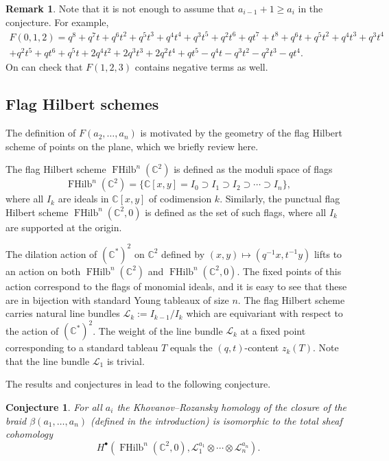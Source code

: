 \documentclass[11pt,reqno]{amsart}
\newtheorem{conjecture}[theorem]{Conjecture}
\theoremstyle{definition}
\newtheorem{remark}[theorem]{Remark}
\numberwithin{equation}{section}
\DeclareMathOperator{\FHilb}{FHilb}
\newcommand{\CC}{\mathbb{C}}
\newcommand{\CL}{\mathcal{L}}
\begin{document}
\begin{remark}
Note that it is not enough to assume that $a_{i-1}+1 \geqslant a_i$ in the conjecture. For example, 
\begin{multline*}
	F(0,1,2)=q^8 + q^7t + q^6t^2 + q^5t^3 + q^4t^4 + q^3t^5 + q^2t^6 + qt^7 + t^8 + q^6t + q^5t^2 + q^4t^3 + q^3t^4 \\
	+ q^2t^5 + qt^6 + q^5t + 2q^4t^2 + 2q^3t^3 + 2q^2t^4 + qt^5 - q^4t - q^3t^2 - q^2t^3 - qt^4.
\end{multline*}
On can check that $F(1,2,3)$ contains negative terms as well.
\end{remark}

\subsection{Flag Hilbert schemes}
\label{subsec.fhilb}

The definition of $F(a_2,\ldots,a_n)$ is motivated by the geometry of the flag Hilbert scheme of points on the plane,
which we briefly review here.

The flag Hilbert scheme $\FHilb^n(\CC^2)$ is defined as the moduli space of flags  
\[
	\FHilb^n(\CC^2)=\{\CC[x,y]=I_0\supset I_1\supset I_2 \supset \cdots \supset I_n\},
\]
where all $I_k$ are ideals in $\CC[x,y]$ of codimension $k$. Similarly, the punctual flag Hilbert scheme $\FHilb^n(\CC^2,0)$
is defined as the set of such flags, where all $I_k$ are supported at the origin.

The dilation action of $(\CC^*)^2$ on $\CC^2$ defined by $(x,y)\mapsto (q^{-1}x,t^{-1}y)$ lifts to an action on both 
$\FHilb^n(\CC^2)$ and $\FHilb^n(\CC^2,0)$. The fixed points of this action correspond to the flags of monomial ideals, 
and it is easy to see that these are in bijection with standard Young tableaux of size $n$. The flag Hilbert scheme carries 
natural line bundles $\CL_k:=I_{k-1}/I_k$ which are equivariant with respect to the action of $(\CC^*)^2$.
The weight of the line bundle $\CL_k$ at a fixed point corresponding to a standard tableau $T$ equals the 
$(q,t)$-content $z_k(T)$. Note that the line bundle $\CL_1$ is trivial.

The results and conjectures in \cite{GNR.2016,OR.2017} lead to the following conjecture.

\begin{conjecture}
For all $a_i$ the Khovanov--Rozansky homology of the closure of the braid $\beta(a_1,\ldots,a_n)$ 
(defined in the introduction) is isomorphic to the total sheaf cohomology
\[
	H^{\bullet}(\FHilb^n(\CC^2,0),\CL_1^{a_1}\otimes\cdots\otimes \CL_n^{a_n}).
\]
\end{conjecture}
\end{document}
